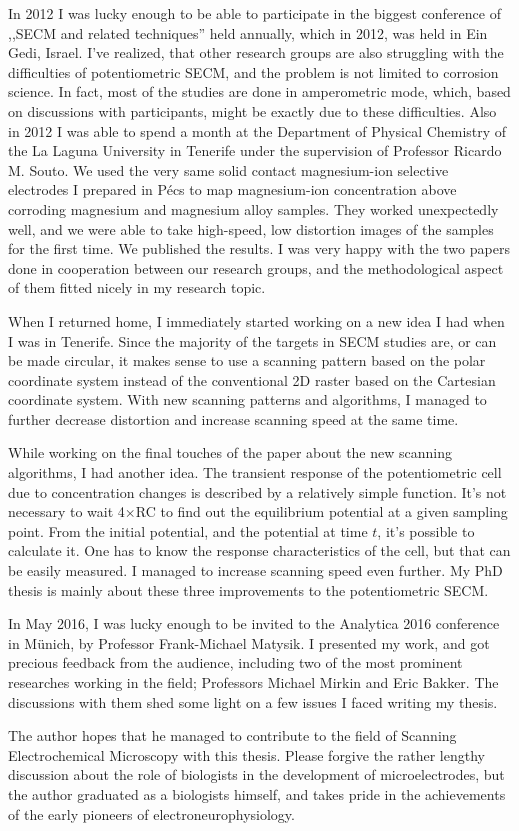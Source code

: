 In 2012 I was lucky enough to be able to participate in the biggest conference of ,,SECM and related techniques'' held annually, which in 2012, was held in Ein Gedi, Israel.
I've realized, that other research groups are also struggling with the difficulties of potentiometric SECM, and the problem is not limited to corrosion science.
In fact, most of the studies are done in amperometric mode, which, based on discussions with participants, might be exactly due to these difficulties.
Also in 2012 I was able to spend a month at the Department of Physical Chemistry of the La Laguna University in Tenerife under the supervision of Professor Ricardo M. Souto.
We used the very same solid contact magnesium-ion selective electrodes I prepared in Pécs to map magnesium-ion concentration above corroding magnesium and magnesium alloy samples.
They worked unexpectedly well, and we were able to take high-speed, low distortion images of the samples for the first time.
We published the results.
I was very happy with the two papers done in cooperation between our research groups, and the methodological aspect of them fitted nicely in my research topic.

When I returned home, I immediately started working on a new idea I had when I was in Tenerife.
Since the majority of the targets in SECM studies are, or can be made circular, it makes sense to use a scanning pattern based on the polar coordinate system instead of the conventional 2D raster based on the Cartesian coordinate system.
With new scanning patterns and algorithms, I managed to further decrease distortion and increase scanning speed at the same time.

While working on the final touches of the paper about the new scanning algorithms, I had another idea.
The transient response of the potentiometric cell due to concentration changes is described by a relatively simple function.
It's not necessary to wait 4$\times$RC to find out the equilibrium potential at a given sampling point.
From the initial potential, and the potential at time $t$, it's possible to calculate it.
One has to know the response characteristics of the cell, but that can be easily measured.
I managed to increase scanning speed even further.
My PhD thesis is mainly about these three improvements to the potentiometric SECM.

In May 2016, I was lucky enough to be invited to the Analytica 2016 conference in Münich, by Professor Frank-Michael Matysik.
I presented my work, and got precious feedback from the audience, including two of the most prominent researches working in the field; Professors Michael Mirkin and Eric Bakker.
The discussions with them shed some light on a few issues I faced writing my thesis.

The author hopes that he managed to contribute to the field of Scanning Electrochemical Microscopy with this thesis.
Please forgive the rather lengthy discussion about the role of biologists in the development of microelectrodes, but the author graduated as a biologists himself, and takes pride in the achievements of the early pioneers of electroneurophysiology.
